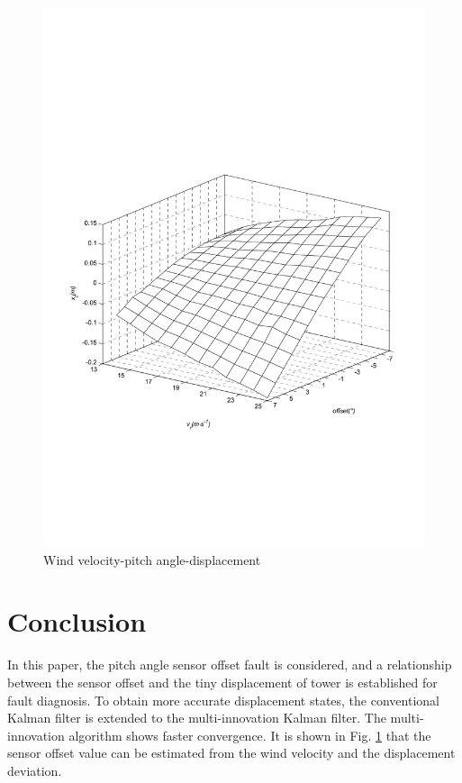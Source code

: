 \begin{figure}[!htb]
  \centering
  \includegraphics[width=\hsize]{MATLAB-3d.pdf}
  \caption{Wind velocity-pitch angle-displacement}
  \label{fig:3d}
\end{figure}


\section{Conclusion}

In this paper, the pitch angle sensor offset fault is considered,
and a
relationship between the sensor offset and the tiny displacement of
tower is established for fault diagnosis. To obtain more
accurate displacement states, the conventional Kalman filter is
extended to the multi-innovation Kalman filter. The multi-innovation
algorithm shows faster convergence.
It is shown in Fig. \ref{fig:3d} that the sensor offset value
can be estimated from the wind velocity and the displacement
deviation.




